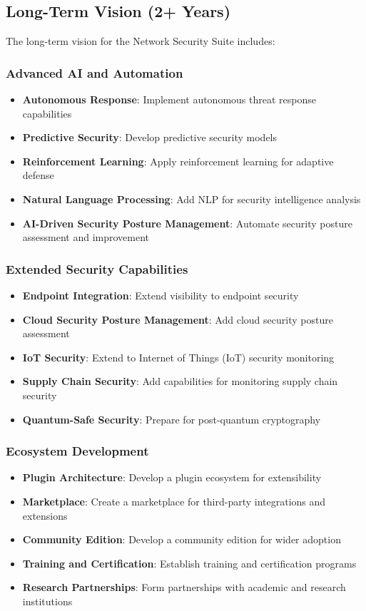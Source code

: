 \subsection{Long-Term Vision (2+ Years)}
The long-term vision for the Network Security Suite includes:

\subsubsection{Advanced AI and Automation}
\begin{itemize}
    \item \textbf{Autonomous Response}: Implement autonomous threat response capabilities
    \item \textbf{Predictive Security}: Develop predictive security models
    \item \textbf{Reinforcement Learning}: Apply reinforcement learning for adaptive defense
    \item \textbf{Natural Language Processing}: Add NLP for security intelligence analysis
    \item \textbf{AI-Driven Security Posture Management}: Automate security posture assessment and improvement
\end{itemize}

\subsubsection{Extended Security Capabilities}
\begin{itemize}
    \item \textbf{Endpoint Integration}: Extend visibility to endpoint security
    \item \textbf{Cloud Security Posture Management}: Add cloud security posture assessment
    \item \textbf{IoT Security}: Extend to Internet of Things (IoT) security monitoring
    \item \textbf{Supply Chain Security}: Add capabilities for monitoring supply chain security
    \item \textbf{Quantum-Safe Security}: Prepare for post-quantum cryptography
\end{itemize}

\subsubsection{Ecosystem Development}
\begin{itemize}
    \item \textbf{Plugin Architecture}: Develop a plugin ecosystem for extensibility
    \item \textbf{Marketplace}: Create a marketplace for third-party integrations and extensions
    \item \textbf{Community Edition}: Develop a community edition for wider adoption
    \item \textbf{Training and Certification}: Establish training and certification programs
    \item \textbf{Research Partnerships}: Form partnerships with academic and research institutions
\end{itemize}

